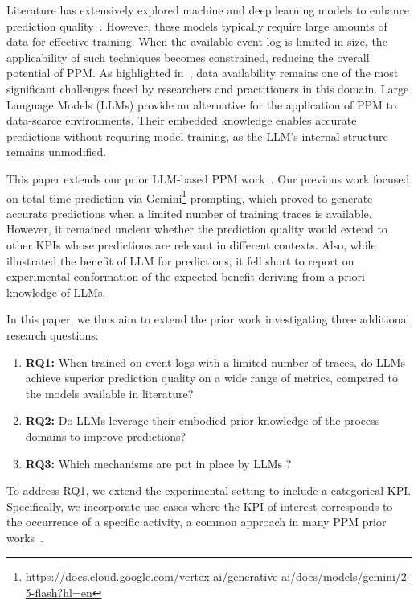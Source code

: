 \documentclass[manuscript,screen,review]{acmart}
\begin{document}
Literature has extensively explored machine and deep learning models to enhance prediction quality~\cite{crvl}. However, these models typically require large amounts of data for effective training. When the available event log is limited in size, the applicability of such techniques becomes constrained, reducing the overall potential of PPM. As highlighted in~\cite{zimmermann,crvl}, data availability remains one of the most significant challenges faced by researchers and practitioners in this domain. Large Language Models (LLMs) provide an alternative for the application of PPM to data-scarce environments. Their embedded knowledge enables accurate predictions without requiring model training, as the LLM's internal structure remains unmodified.

This paper extends our prior LLM-based PPM work~\cite{10.1007/978-3-032-02929-4_16}. 
Our previous work focused on total time prediction via Gemini\footnote{\url{https://docs.cloud.google.com/vertex-ai/generative-ai/docs/models/gemini/2-5-flash?hl=en}} prompting, which proved to generate accurate predictions when a limited number of training traces is available. However, it remained unclear whether the prediction quality would extend to other KPIs whose predictions are relevant in different contexts. Also, while~\cite{10.1007/978-3-032-02929-4_16} illustrated the benefit of LLM for predictions, it fell short to report on experimental conformation of the expected benefit deriving from a-priori knowledge of LLMs.

In this paper, we thus aim to extend the prior work investigating three additional research questions: 
\begin{enumerate}
    \item \textbf{RQ1:} When trained on event logs with a limited number of traces, do LLMs achieve superior prediction quality on a wide range of metrics, compared to the models available in literature?

    \item \textbf{RQ2:} Do LLMs leverage their embodied prior knowledge of the process domains to improve predictions?

    \item \textbf{RQ3:} Which mechanisms are put in place by LLMs ?
\end{enumerate}
To address RQ1, we extend the experimental setting to include a categorical KPI. Specifically, we incorporate use cases where the KPI of interest corresponds to the occurrence of a specific activity, a common approach in many PPM prior works~\cite{crvl,Marquez-Chamorro18,outcome_oriented_teinemaa, 9230308}.
\end{document}
